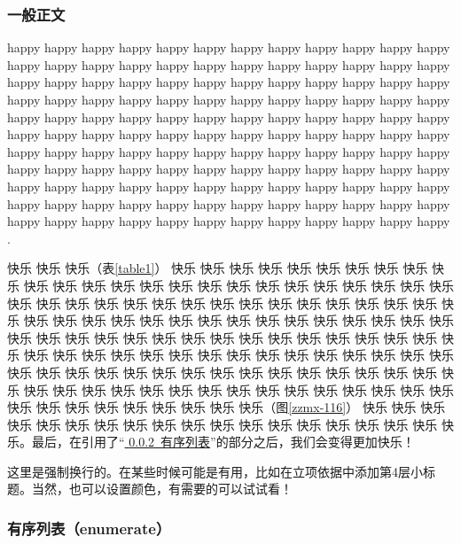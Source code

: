 
\subsubsection{一般正文}

\justifying

\indent\setlength{\parindent}{2em}%

happy happy happy happy happy happy happy happy happy happy happy happy happy happy happy happy happy happy happy happy happy happy happy happy happy happy happy happy happy happy happy happy happy happy happy happy happy happy happy happy happy happy happy happy happy happy happy happy happy happy happy happy happy happy happy happy happy happy happy happy happy happy happy happy happy happy happy happy happy happy happy happy happy happy happy happy happy happy happy happy happy\cite{Smith1900} happy happy happy happy happy happy happy happy happy happy happy happy happy happy happy happy happy happy happy happy happy happy happy happy happy happy happy happy happy happy happy happy happy happy happy happy happy happy happy happy happy happy happy happy happy happy happy happy happy happy happy \cite{John1997}.

快乐 快乐 快乐（表\ref{table1}） 快乐 快乐 快乐 快乐 快乐 快乐 快乐 快乐 快乐 快乐 快乐 快乐 快乐 快乐 快乐 快乐 快乐 快乐 快乐 快乐 快乐 快乐 快乐 快乐 快乐 快乐 快乐 快乐 快乐 快乐 快乐 快乐 快乐 快乐 快乐 快乐 快乐 快乐 快乐 快乐 快乐 快乐 快乐 快乐 快乐 快乐 快乐 快乐 快乐 快乐 快乐 快乐 快乐 快乐 快乐 快乐 快乐 快乐 快乐 快乐 快乐 快乐 快乐 快乐 快乐 快乐 快乐 快乐 快乐 快乐 快乐 快乐 快乐 快乐 快乐 快乐 快乐 快乐 快乐 快乐 快乐 快乐 快乐 快乐 快乐 快乐 快乐 快乐 快乐 快乐 快乐 快乐 快乐 快乐 快乐 快乐 快乐 快乐 快乐 快乐 快乐 快乐 快乐 快乐 快乐 快乐 快乐 快乐 快乐 快乐 快乐 快乐 快乐 快乐 快乐 快乐 快乐 快乐 快乐 快乐 快乐 快乐 快乐 快乐 快乐 快乐 快乐（图\ref{zzmx-116}） 快乐 快乐 快乐 快乐 快乐 快乐 快乐 快乐 快乐 快乐 快乐 快乐 快乐 快乐 快乐 快乐 快乐 快乐 快乐。最后，在引用了“\hyperref[sec:有序列表]{\color{MsBlue} \ref{sec:有序列表}~有序列表}”的部分之后，我们会变得更加快乐！

\indent\setlength{\parindent}{2em}

这里是强制换行的。在某些时候可能是有用，比如在立项依据中添加第4层小标题。当然，也可以设置颜色，有需要的可以试试看！

\subsubsection{有序列表（enumerate）}\label{sec:有序列表}
\indent\setlength{\parindent}{2em}


